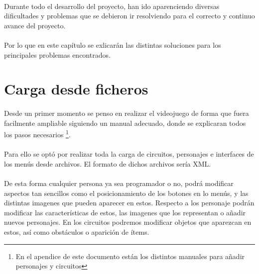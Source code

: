 \paragraph{}
Durante todo el desarrollo del proyecto, han ido aparenciendo diversas dificultades y problemas que se debieron ir
resolviendo para el correcto y continuo avance del proyecto.

\paragraph{}
Por lo que en este capítulo se exlicarán las distintas soluciones para los principales problemas encontrados. 


\section{Carga desde ficheros}

\paragraph{}
Desde un primer momento se penso en realizar el videojuego de forma que fuera facilmente ampliable siguiendo un manual adecuado, 
donde se explicaran todos los pasos necesarios \footnote{En el apendice de este documento están los distintos manuales para
añadir personajes y circuitos}.

\paragraph{}
Para ello se optó por realizar toda la carga de circuitos, personajes e interfaces de los menús desde archivos. El formato de 
dichos archivos sería XML.

\paragraph{}
De esta forma cualquier persona ya sea programador o no, podrá modificar aspectos tan sencillos como el posicionamiento de los 
botones en lo menús, y las distintas imagenes que pueden aparecer en estos. Respecto a los personaje podrán modificar las 
características de estos, las imagenes que los representan o añadir nuevos personajes. En los circuitos podremos modificar objetos
que aparezcan en estos, así como obstáculos o aparición de ítems.

